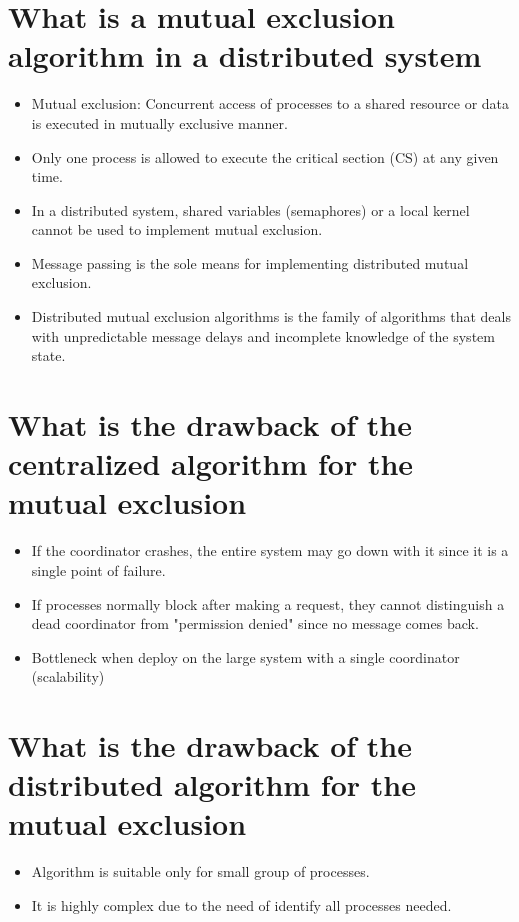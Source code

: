 \documentclass[11pt,a4paper]{article}
\begin{document}
\section{What is a mutual exclusion algorithm in a distributed system}
\begin{itemize}
	\item Mutual exclusion: Concurrent access of processes to a shared resource or data is executed in mutually exclusive manner.
	\item Only one process is allowed to execute the critical section (CS) at any given time.
	\item In a distributed system, shared variables (semaphores) or a local kernel cannot be used to implement mutual exclusion.
	\item Message passing is the sole means for implementing distributed mutual exclusion.
	\item Distributed mutual exclusion algorithms is the family of algorithms that deals with unpredictable message delays and incomplete knowledge of the system state.
\end{itemize}

\section{What is the drawback of the centralized algorithm for the mutual exclusion}
\begin{itemize}
	\item If the coordinator crashes, the entire system may go down with it since it is a single point of failure.
	\item If processes normally block after making a request, they cannot distinguish a dead coordinator from "permission denied" since no message comes back.
	\item Bottleneck when deploy on the large system with a single coordinator (scalability)
\end{itemize}

\section{What is the drawback of the distributed algorithm for the mutual exclusion}
\begin{itemize}
	\item Algorithm is suitable only for small group of processes.
	\item It is highly complex due to the need of identify all processes needed.
\end{itemize}
\end{document}
